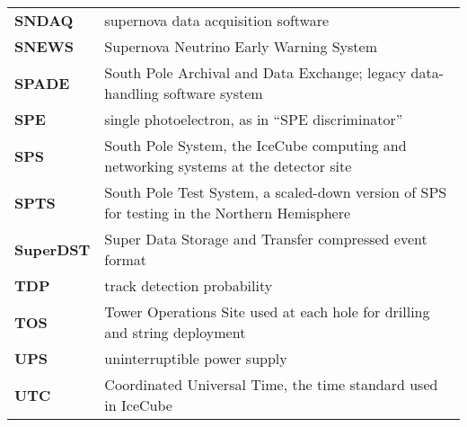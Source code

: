 \begin{longtable}{p{} p{}}
  \textbf{SNDAQ} & supernova data acquisition software \\

  \textbf{SNEWS} & Supernova Neutrino Early Warning System \\

  \textbf{SPADE} & South Pole Archival and Data Exchange; legacy
  data-handling software system \\
  
  \textbf{SPE} & single photoelectron, as in ``SPE discriminator'' \\

  \textbf{SPS} & South Pole System, the IceCube computing and networking
  systems at the detector site \\

  \textbf{SPTS} & South Pole Test System, a scaled-down version of SPS for
  testing in the Northern Hemisphere \\

  \textbf{SuperDST} & Super Data Storage and Transfer compressed event
  format \\ 
  
  \textbf{TDP} & track detection probability \\

  \textbf{TOS} & Tower Operations Site used at each hole for drilling
  and string deployment \\

  \textbf{UPS} & uninterruptible power supply \\
  
  \textbf{UTC} & Coordinated Universal Time, the time standard used in
  IceCube \\
  
\end{longtable}
